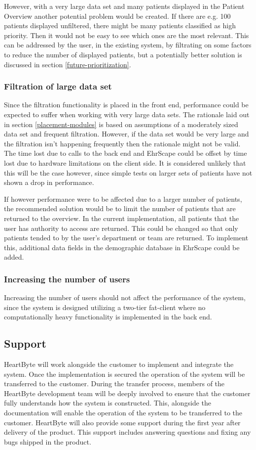 \documentclass{article}
\begin{document}
However, with a very large data set and many patients displayed in the Patient Overview another potential problem would be created. If there are e.g. 100 patients displayed unfiltered, there might be many patients classified as high priority. Then it would not be easy to see which ones are the most relevant. This can be addressed by the user, in the existing system, by filtrating on some factors to reduce the number of displayed patients, but a potentially better solution is discussed in section \ref{future-prioritization}.

\subsubsection{Filtration of large data set}
Since the filtration functionality is placed in the front end, performance could be expected to suffer when working with very large data sets. The rationale laid out in section \ref{placement-modules} is based on assumptions of a moderately sized data set and frequent filtration. However, if the data set would be very large and the filtration isn't happening frequently then the rationale might not be valid. The time lost due to calls to the back end and EhrScape could be offset by time lost due to hardware limitations on the client side. It is considered unlikely that this will be the case however, since simple tests on larger sets of patients have not shown a drop in performance.

If however performance were to be affected due to a larger number of patients, the recommended solution would be to limit the number of patients that are returned to the overview. In the current implementation, all patients that the user has authority to access are returned. This could be changed so that only patients tended  to by the user's department or team are returned. To implement this, additional data fields in the demographic database in EhrScape could be added.

\subsubsection{Increasing the number of users}
Increasing the number of users should not affect the performance of the system, since the system is designed utilizing a two-tier fat-client where no computationally heavy functionality is implemented in the back end. 

\subsection{Support}
HeartByte will work alongside the customer to implement and integrate the system. Once the implementation is secured the operation of the system will be transferred to the customer. During the transfer process, members of the HeartByte development team will be deeply involved to ensure that the customer fully understands how the system is constructed. This, alongside the documentation will enable the operation of the system to be transferred to the customer. HeartByte will also provide some support during the first year after delivery of the product. This support includes answering questions and fixing any bugs shipped in the product.
\end{document}
